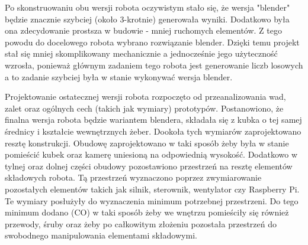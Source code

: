 Po skonstruowaniu obu wersji robota oczywistym stało się, że wersja "blender" będzie znacznie szybciej (około 3-krotnie) generowała wyniki. 
Dodatkowo była ona zdecydowanie prostsza w budowie - mniej ruchomych elementów. Z tego powodu do docelowego robota wybrano 
rozwiązanie blender. Dzięki temu projekt stał się mniej skomplikowany mechanicznie a jednocześnie jego użyteczność wzrosła, ponieważ
głównym zadaniem tego robota jest generowanie liczb losowych a to zadanie szybciej była w stanie wykonywać wersja blender.

Projektowanie ostatecznej wersji robota rozpoczęto od przeanalizowania wad, zalet oraz ogólnych cech (takich jak wymiary) prototypów.
Postanowiono, że finalna wersja robota będzie wariantem blendera, składała się z kubka o tej samej średnicy i kształcie wewnętrznych
żeber. Dookoła tych wymiarów zaprojektowano resztę konstrukcji. Obudowę zaprojektowano w taki sposób żeby była w stanie pomieścić
kubek oraz kamerę uniesioną na odpowiednią wysokość. Dodatkowo w tylnej oraz dolnej części obudowy pozostawiono przestrzeń na resztę
elementów składowych robota. Tą przestrzeń wyznaczono poprzez zwymiarowanie pozostałych elementów takich jak silnik, sterownik, wentylator 
czy Raspberry Pi. Te wymiary posłużyły do wyznaczenia minimum potrzebnej przestrzeni. Do tego minimum dodano (CO) w taki sposób
żeby we wnętrzu pomieściły się również przewody, śruby oraz żeby po całkowitym złożeniu pozostała przestrzeń do swobodnego manipulowania
elementami składowymi.

